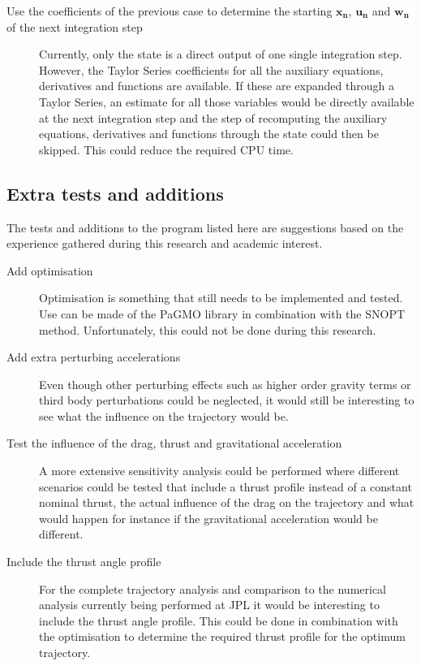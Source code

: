 \begin{description}
\item[Use the coefficients of the previous case to determine the starting $\mathbf{x_{n}}$, $\mathbf{u_{n}}$ and $\mathbf{w_{n}}$ of the next integration step] Currently, only the state is a direct output of one single integration step. However, the Taylor Series coefficients for all the auxiliary equations, derivatives and functions are available. If these are expanded through a Taylor Series, an estimate for all those variables would be directly available at the next integration step and the step of recomputing the auxiliary equations, derivatives and functions through the state could then be skipped. This could reduce the required CPU time.

\end{description}



\subsection{Extra tests and additions}
\label{subsec:extraTestsAndAdditions}
The tests and additions to the program listed here are suggestions based on the experience gathered during this research and academic interest. 

\begin{description}
\item[Add optimisation] Optimisation is something that still needs to be implemented and tested. Use can be made of the \ac{PaGMO} library in combination with the \ac{SNOPT} method. Unfortunately, this could not be done during this research.
\item[Add extra perturbing accelerations] Even though other perturbing effects such as higher order gravity terms or third body perturbations could be neglected, it would still be interesting to see what the influence on the trajectory would be.
\item[Test the influence of the drag, thrust and gravitational acceleration] A more extensive sensitivity analysis could be performed where different scenarios could be tested that include a thrust profile instead of a constant nominal thrust, the actual influence of the drag on the trajectory and what would happen for instance if the gravitational acceleration would be different.
\item[Include the thrust angle profile] For the complete trajectory analysis and comparison to the numerical analysis currently being performed at \ac{JPL} it would be interesting to include the thrust angle profile. This could be done in combination with the optimisation to determine the required thrust profile for the optimum trajectory.

\end{description}

